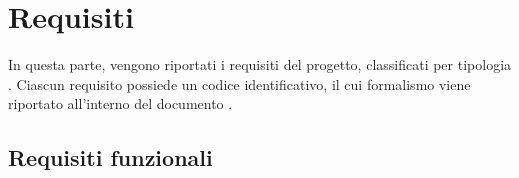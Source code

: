 \section{Requisiti}


\newcommand{\req}[3]{\textbf{R#1-#2-#3}}
\newcommand{\sreq}[3]{{\color{gray} R#1-#2-}#3}
\newcommand{\autism}{ \\ \hline}


In questa parte, vengono riportati i requisiti del progetto, classificati per tipologia . Ciascun requisito possiede un codice identificativo, il cui formalismo viene riportato all'interno del documento .




	\subsection{Requisiti funzionali}

